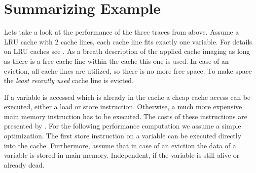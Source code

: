 \documentclass[onecolumn, openright, master, english, signatures]{dbrgrptt}
\begin{document}
\section{Summarizing Example}

Lets take a look at the performance of the three \ac{trace}s from above. Assume a \ac{LRU} cache with 2 cache lines, each cache line fits exactly one variable. For details on \ac{LRU} caches see . As a breath description of the applied cache imaging as long as there is a free cache line within the cache this one is used. In case of an eviction, all cache lines are utilized, so there is no more free space. To make space the \emph{least recently used} cache line is evicted.

If a variable is accessed which is already in the cache a cheap cache access can be executed, either a load or store instruction. Otherwise, a much more expensive main memory instruction has to be executed. The costs of these instructions are presented by . For the following performance computation we assume a simple optimization. The first store instruction on a variable can be executed directly into the cache. Furthermore, assume that in case of an eviction the data of a variable is stored in main memory. Independent, if the variable is still alive or already dead.
\end{document}
